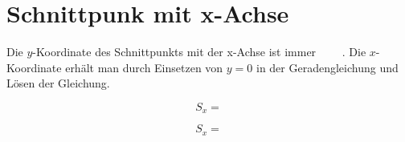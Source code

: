 \documentclass[a4paper]{scrartcl}
\begin{document}
\section{Schnittpunk mit x-Achse}
Die $y$-Koordinate des Schnittpunkts mit der x-Achse ist immer $\qquad$.
Die $x$-Koordinate erhält man durch Einsetzen von $y = 0$ in der Geradengleichung und Lösen der Gleichung.

\begin{minipage}{0.5\linewidth}

$$S_x = $$

\end{minipage}
\begin{minipage}{0.5\linewidth}




$$S_x = $$

\end{minipage}
\end{document}
